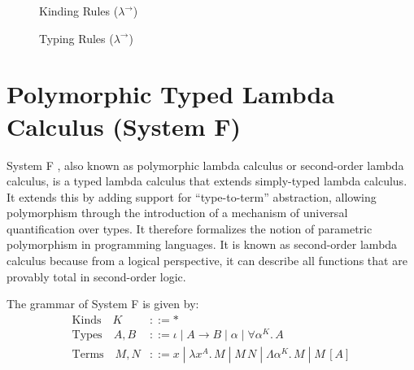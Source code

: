 \documentclass[acmsmall, 9pt]{article}
\begin{document}
\begin{figure}[H]
\flushleft {}
\caption{Kinding Rules ($\lambda^{\rightarrow}$)}
\end{figure}

\begin{figure}[H]
\flushleft {}
\caption{Typing Rules ($\lambda^{\rightarrow}$)}
\end{figure}

\section{Polymorphic Typed Lambda Calculus (System F)}
System F \cite{lambda-calc, cambridge-lambda-calc}, also known as polymorphic lambda calculus or second-order lambda calculus, is a typed lambda calculus that extends simply-typed lambda calculus. It extends this by adding support for ``type-to-term'' abstraction, allowing polymorphism through the introduction of a mechanism of universal quantification over types. It therefore formalizes the notion of parametric polymorphism in programming languages. It is known as second-order lambda calculus because from a logical perspective, it can describe all functions that are provably total in second-order logic.


\lbreak
The grammar of System F is given by:
\begin{align*}
  \text{Kinds} \quad K &::= * \\
  \text{Types} \quad  A, B &::= \iota \; | \; A \rightarrow B \; | \; \alpha \; | \; \forall \alpha^K. \, A  \\
  \text{Terms} \quad M, N &::= x \; | \; \lambda x^A . \, M \; | \; M \, N  \; | \; \Lambda \alpha^K . \, M \; | \; M \, [A]
\end{align*}
\end{document}
